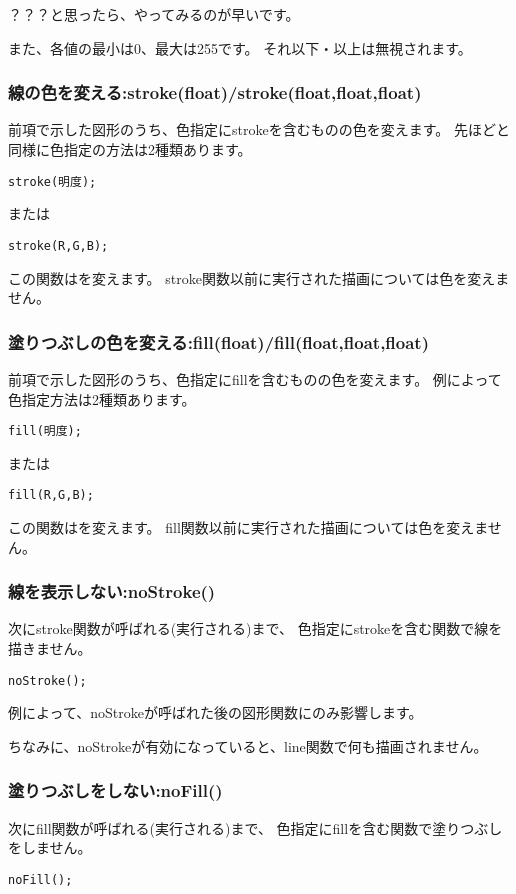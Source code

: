 \documentclass[12pt,titlepage]{ltjsarticle}
\begin{document}
？？？と思ったら、やってみるのが早いです。

また、各値の最小は0、最大は255です。
それ以下・以上は無視されます。

\subsubsection{線の色を変える:stroke(float)/stroke(float,float,float)}
前項で示した図形のうち、色指定にstrokeを含むものの色を変えます。
先ほどと同様に色指定の方法は2種類あります。

\verb#stroke(明度);#


または

\verb#stroke(R,G,B);#

この関数はを変えます。
stroke関数以前に実行された描画については色を変えません。

\subsubsection{塗りつぶしの色を変える:fill(float)/fill(float,float,float)}
前項で示した図形のうち、色指定にfillを含むものの色を変えます。
例によって色指定方法は2種類あります。

\verb#fill(明度);#


または

\verb#fill(R,G,B);#

この関数はを変えます。
fill関数以前に実行された描画については色を変えません。

\subsubsection{線を表示しない:noStroke()}
次にstroke関数が呼ばれる(実行される)まで、
色指定にstrokeを含む関数で線を描きません。

\verb#noStroke();#

例によって、noStrokeが呼ばれた後の図形関数にのみ影響します。

ちなみに、noStrokeが有効になっていると、line関数で何も描画されません。

\subsubsection{塗りつぶしをしない:noFill()}
次にfill関数が呼ばれる(実行される)まで、
色指定にfillを含む関数で塗りつぶしをしません。

\verb#noFill();#
\end{document}
